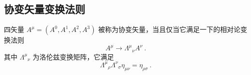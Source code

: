 

\subsection{协变矢量变换法则}
四矢量 $A^\mu=(A^0,A^1,A^2,A^3)$ 被称为协变矢量，当且仅当它满足一下的相对论变换法则
\begin{equation}
A^\mu\rightarrow \Lambda^{\mu}{}_\nu A^\nu~.
\end{equation}
其中 $\Lambda^\mu{}_\nu$ 为洛伦兹变换矩阵，它满足
\begin{equation}
\Lambda^{\mu}{}_{\rho} \Lambda^{\nu}{}_{\sigma} \eta_{\mu\nu} = \eta_{\rho\sigma}~.
\end{equation}
